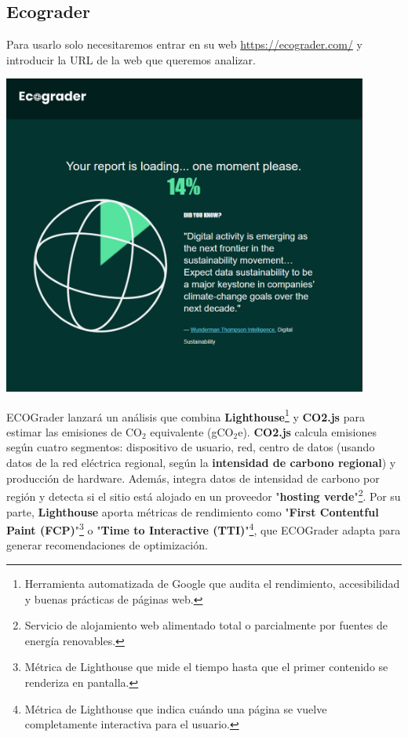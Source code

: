 \documentclass[12pt,a4paper]{report}
\begin{document}
\subsection{Ecograder}
Para usarlo solo necesitaremos entrar en su web \url{https://ecograder.com/} y
introducir la URL de la web que queremos analizar.

\begin{center}
  \includegraphics[width=0.9\textwidth]{imagenes/Ecograder_1.png}
\end{center}

ECOGrader lanzará un análisis que combina
\textbf{Lighthouse}\footnote{Herramienta automatizada de Google que audita el
  rendimiento, accesibilidad y buenas prácticas de páginas web.} y
\textbf{CO2.js} para estimar las emisiones de CO$_2$ equivalente (gCO$_2$e).
\textbf{CO2.js} calcula emisiones según cuatro segmentos: dispositivo de
usuario, red, centro de datos (usando datos de la red eléctrica regional, según
la \textbf{intensidad de carbono regional}) y producción de hardware. Además, integra datos de
intensidad de carbono por región y detecta si el sitio está alojado en un
proveedor "\textbf{hosting verde}"\footnote{Servicio de alojamiento web
  alimentado total o parcialmente por fuentes de energía renovables.}. Por su
parte, \textbf{Lighthouse} aporta métricas de rendimiento como "\textbf{First
  Contentful Paint (FCP)}"\footnote{Métrica de Lighthouse que mide el tiempo
  hasta que el primer contenido se renderiza en pantalla.} o "\textbf{Time to
  Interactive (TTI)}"\footnote{Métrica de Lighthouse que indica cuándo una página
  se vuelve completamente interactiva para el usuario.}, que ECOGrader adapta
para generar recomendaciones de optimización.
\end{document}
